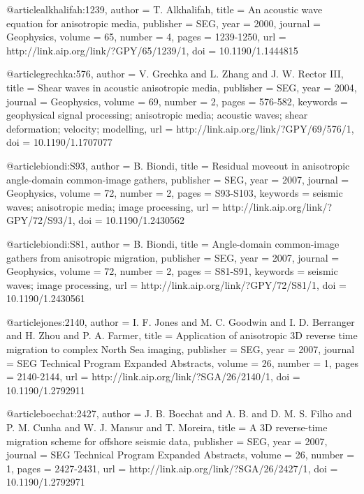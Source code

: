 {@article{alkhalifah:1239,
  author =	 {T. Alkhalifah},
  title =	 {An acoustic wave equation for anisotropic media},
  publisher =	 {SEG},
  year =	 2000,
  journal =	 {Geophysics},
  volume =	 65,
  number =	 4,
  pages =	 {1239-1250},
  url =		 {http://link.aip.org/link/?GPY/65/1239/1},
  doi =		 {10.1190/1.1444815}
}

@article{grechka:576,
  author =	 {V. Grechka and L. Zhang and J.
                  W. Rector III},
  title =	 {Shear waves in acoustic anisotropic media},
  publisher =	 {SEG},
  year =	 2004,
  journal =	 {Geophysics},
  volume =	 69,
  number =	 2,
  pages =	 {576-582},
  keywords =	 {geophysical signal processing; anisotropic media;
                  acoustic waves; shear deformation; velocity;
                  modelling},
  url =		 {http://link.aip.org/link/?GPY/69/576/1},
  doi =		 {10.1190/1.1707077}
}

@article{biondi:S93,
  author =	 {B. Biondi},
  title =	 {Residual moveout in anisotropic angle-domain
                  common-image gathers},
  publisher =	 {SEG},
  year =	 2007,
  journal =	 {Geophysics},
  volume =	 72,
  number =	 2,
  pages =	 {S93-S103},
  keywords =	 {seismic waves; anisotropic media; image processing},
  url =		 {http://link.aip.org/link/?GPY/72/S93/1},
  doi =		 {10.1190/1.2430562}
}

@article{biondi:S81,
  author =	 {B. Biondi},
  title =	 {Angle-domain common-image gathers from anisotropic
                  migration},
  publisher =	 {SEG},
  year =	 2007,
  journal =	 {Geophysics},
  volume =	 72,
  number =	 2,
  pages =	 {S81-S91},
  keywords =	 {seismic waves; image processing},
  url =		 {http://link.aip.org/link/?GPY/72/S81/1},
  doi =		 {10.1190/1.2430561}
}

@article{jones:2140,
  author =	 {I. F. Jones and M. C. Goodwin and I. D. Berranger
                  and H. Zhou and P. A. Farmer},
  title =	 {Application of anisotropic {3D} reverse time
                  migration to complex {N}orth {S}ea imaging},
  publisher =	 {SEG},
  year =	 2007,
  journal =	 {SEG Technical Program Expanded Abstracts},
  volume =	 26,
  number =	 1,
  pages =	 {2140-2144},
  url =		 {http://link.aip.org/link/?SGA/26/2140/1},
  doi =		 {10.1190/1.2792911}
}

@article{boechat:2427,
  author =	 {J. B. Boechat and A. B.
                  and D. M. S. Filho and P. M. Cunha and
                  W. J. Mansur and T. Moreira},
  title =	 {A {3D} reverse-time migration scheme for offshore
                  seismic data},
  publisher =	 {SEG},
  year =	 2007,
  journal =	 {SEG Technical Program Expanded Abstracts},
  volume =	 26,
  number =	 1,
  pages =	 {2427-2431},
  url =		 {http://link.aip.org/link/?SGA/26/2427/1},
  doi =		 {10.1190/1.2792971}
}

}
